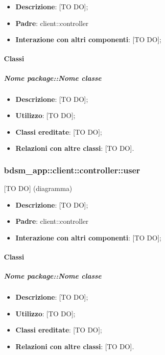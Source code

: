 	\begin{itemize}
		\item \textbf{Descrizione}: [TO DO];
		\item \textbf{Padre}: client::controller
		\item \textbf{Interazione con altri componenti}: [TO DO];
	\end{itemize}

		\paragraph{Classi} %
			\subparagraph{Nome package::Nome classe} %
			\label{subp:subparagraph_name}
				\begin{itemize}
					\item \textbf{Descrizione}: [TO DO];
					\item \textbf{Utilizzo}: [TO DO];
					\item \textbf{Classi ereditate}: [TO DO];
					\item \textbf{Relazioni con altre classi}: [TO DO].
				\end{itemize}



	\subsubsection{bdsm\_app::client::controller::user} %
	\label{ssub:bdsm_app_client_controller_user}
	[TO DO] (diagramma) \newline \newline

	\begin{itemize}
		\item \textbf{Descrizione}: [TO DO];
		\item \textbf{Padre}: client::controller
		\item \textbf{Interazione con altri componenti}: [TO DO];
	\end{itemize}

		\paragraph{Classi} %
			\subparagraph{Nome package::Nome classe} %
			\label{subp:subparagraph_name}
				\begin{itemize}
					\item \textbf{Descrizione}: [TO DO];
					\item \textbf{Utilizzo}: [TO DO];
					\item \textbf{Classi ereditate}: [TO DO];
					\item \textbf{Relazioni con altre classi}: [TO DO].
				\end{itemize}

